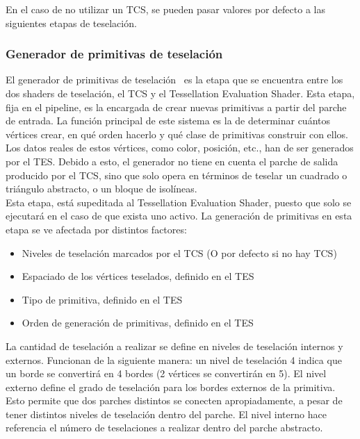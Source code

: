 En el caso de no utilizar un TCS, se pueden pasar valores por defecto a las
siguientes etapas de teselación.

\subsubsection{Generador de primitivas de teselación}
\label{ref:TesPriGen}

El generador de primitivas de teselación~\cite{TesPriGen} es la etapa que se
encuentra entre los dos shaders de teselación, el TCS y el Tessellation
Evaluation Shader. Esta etapa, fija en el pipeline, es la encargada de crear
nuevas primitivas a partir del parche de entrada. La función principal de este
sistema es la de determinar cuántos vértices crear, en qué orden hacerlo y qué
clase de primitivas construir con ellos. Los datos reales de estos vértices,
como color, posición, etc., han de ser generados por el TES. Debido a esto, el
generador no tiene en cuenta el parche de salida producido por el TCS, sino que
solo opera en términos de teselar un cuadrado o triángulo abstracto, o un bloque
de isolíneas.\\

Esta etapa, está supeditada al Tessellation Evaluation Shader, puesto que solo
se ejecutará en el caso de que exista uno activo. La generación de primitivas en
esta etapa se ve afectada por distintos factores:

\begin{itemize}
		\item Niveles de teselación marcados por el TCS (O por defecto si no hay
				TCS)
		\item Espaciado de los vértices teselados, definido en el TES
		\item Tipo de primitiva, definido en el TES
		\item Orden de generación de primitivas, definido en el TES
\end{itemize}

La cantidad de teselación a realizar se define en niveles de teselación internos
y externos. Funcionan de la siguiente manera: un nivel de teselación 4 indica
que un borde se convertirá en 4 bordes (2 vértices se convertirán en 5). El
nivel externo define el grado de teselación para los bordes externos de la
primitiva. Esto permite que dos parches distintos se conecten apropiadamente, a
pesar de tener distintos niveles de teselación dentro del parche. El nivel
interno hace referencia el número de teselaciones a realizar dentro del parche
abstracto. \\

